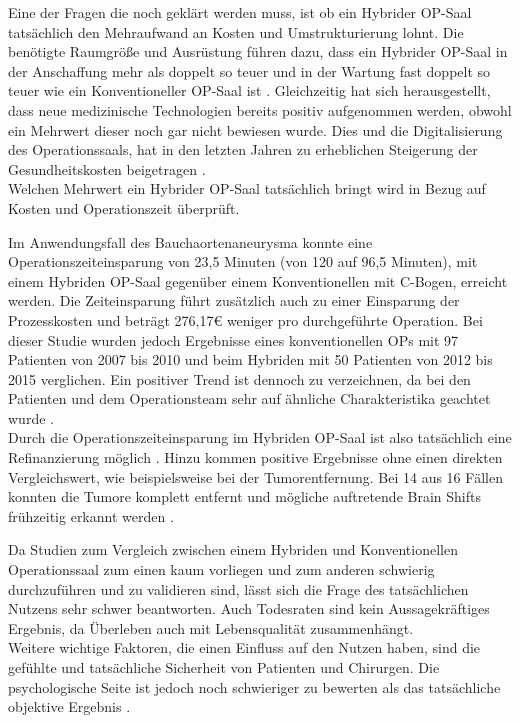 Eine der Fragen die noch geklärt werden muss, ist ob ein Hybrider OP-Saal tatsächlich den Mehraufwand an Kosten und Umstrukturierung lohnt. Die benötigte Raumgröße und Ausrüstung führen dazu, dass ein Hybrider OP-Saal in der Anschaffung mehr als doppelt so teuer und in der Wartung fast doppelt so teuer wie ein Konventioneller OP-Saal ist \cite{HybridOR}. Gleichzeitig hat sich herausgestellt, dass neue medizinische Technologien bereits positiv aufgenommen werden, obwohl ein Mehrwert dieser noch gar nicht bewiesen wurde. Dies und die Digitalisierung des Operationssaals, hat in den letzten Jahren zu erheblichen Steigerung der Gesundheitskosten beigetragen \cite{DerDigitaleOperationssaal}. \\
Welchen Mehrwert ein Hybrider OP-Saal tatsächlich bringt wird in Bezug auf Kosten und Operationszeit überprüft.

Im Anwendungsfall des Bauchaortenaneurysma konnte eine Operationszeiteinsparung von 23,5 Minuten (von 120 auf 96,5 Minuten), mit einem Hybriden OP-Saal gegenüber einem Konventionellen mit C-Bogen, erreicht werden. Die Zeiteinsparung führt zusätzlich auch zu einer Einsparung der Prozesskosten und beträgt 276,17€ weniger pro durchgeführte Operation. Bei dieser Studie wurden jedoch Ergebnisse eines konventionellen OPs mit 97 Patienten von 2007 bis 2010 und beim Hybriden mit 50 Patienten von 2012 bis 2015 verglichen. Ein positiver Trend ist dennoch zu verzeichnen, da bei den Patienten und dem Operationsteam sehr auf  ähnliche Charakteristika geachtet wurde \cite{HybriderVsKonventioneller}.\\
Durch die Operationszeiteinsparung im Hybriden OP-Saal ist also tatsächlich eine Refinanzierung möglich \cite{HybriderVsKonventioneller}. Hinzu kommen positive Ergebnisse ohne einen direkten Vergleichswert, wie beispielsweise bei der Tumorentfernung. Bei 14 aus 16 Fällen konnten die Tumore komplett entfernt und mögliche auftretende Brain Shifts frühzeitig erkannt werden \cite{BrainShiftInTumorResection}.

Da Studien zum Vergleich zwischen einem Hybriden und Konventionellen Operationssaal zum einen kaum vorliegen und zum anderen schwierig durchzuführen und zu validieren sind, lässt sich die Frage des tatsächlichen Nutzens sehr schwer beantworten. Auch Todesraten sind kein Aussagekräftiges Ergebnis, da Überleben auch mit Lebensqualität zusammenhängt\cite{HybriderVsKonventioneller}. \\
Weitere wichtige Faktoren, die einen Einfluss auf den Nutzen haben, sind die gefühlte und tatsächliche Sicherheit von Patienten und Chirurgen. Die psychologische Seite ist jedoch noch schwieriger zu bewerten als das tatsächliche objektive Ergebnis \cite{DerDigitaleOperationssaal}.

